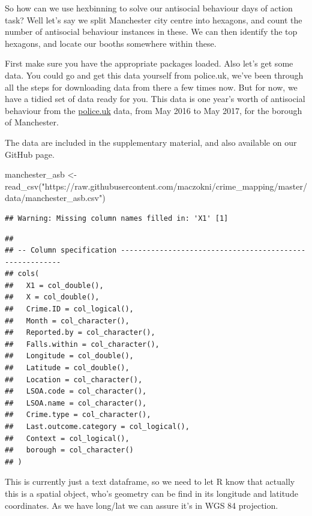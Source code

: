 \documentclass[
]{book}
\newenvironment{Shaded}{\begin{snugshade}}{\end{snugshade}}
\newcommand{\FunctionTok}[1]{\textcolor[rgb]{0.00,0.00,0.00}{#1}}
\newcommand{\NormalTok}[1]{#1}
\newcommand{\OtherTok}[1]{\textcolor[rgb]{0.56,0.35,0.01}{#1}}
\newcommand{\StringTok}[1]{\textcolor[rgb]{0.31,0.60,0.02}{#1}}
\begin{document}
So how can we use hexbinning to solve our antisocial behaviour days of action task? Well let's say we split Manchester city centre into hexagons, and count the number of antisocial behaviour instances in these. We can then identify the top hexagons, and locate our booths somewhere within these.

First make sure you have the appropriate packages loaded. Also let's get some data. You could go and get this data yourself from police.uk, we've been through all the steps for downloading data from there a few times now. But for now, we have a tidied set of data ready for you. This data is one year's worth of antisocial behaviour from the \href{data.police.uk}{police.uk} data, from May 2016 to May 2017, for the borough of Manchester.

The data are included in the supplementary material, and also available on our GitHub page.

\begin{Shaded}
\begin{Highlighting}[]
\NormalTok{manchester\_asb }\OtherTok{\textless{}{-}} \FunctionTok{read\_csv}\NormalTok{(}\StringTok{"https://raw.githubusercontent.com/maczokni/crime\_mapping/master/data/manchester\_asb.csv"}\NormalTok{)}
\end{Highlighting}
\end{Shaded}

\begin{verbatim}
## Warning: Missing column names filled in: 'X1' [1]
\end{verbatim}

\begin{verbatim}
## 
## -- Column specification --------------------------------------------------------
## cols(
##   X1 = col_double(),
##   X = col_double(),
##   Crime.ID = col_logical(),
##   Month = col_character(),
##   Reported.by = col_character(),
##   Falls.within = col_character(),
##   Longitude = col_double(),
##   Latitude = col_double(),
##   Location = col_character(),
##   LSOA.code = col_character(),
##   LSOA.name = col_character(),
##   Crime.type = col_character(),
##   Last.outcome.category = col_logical(),
##   Context = col_logical(),
##   borough = col_character()
## )
\end{verbatim}

This is currently just a text dataframe, so we need to let R know that actually this is a spatial object, who's geometry can be find in its longitude and latitude coordinates. As we have long/lat we can assure it's in WGS 84 projection.
\end{document}

